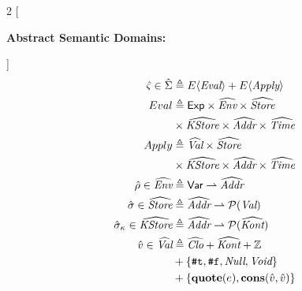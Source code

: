 \documentclass[12pt,draft]{article}
\newcommand{\truesyn}{\texttt{\#t}}
\newcommand{\falsesyn}{\texttt{\#f}}
\begin{document}
\begin{multicols*}{2}
  [
  \begin{center}
    \textbf{Abstract Semantic Domains:}
  \end{center}
  \vspace{-15mm}]
  \begin{align*}
    \vspace{-10mm}
    \hat{\varsigma} \in \hat{\Sigma}
    &\triangleq E\langle \textit{Eval} \rangle + E\langle \textit{Apply} \rangle\\
    Eval &\triangleq \textsf{Exp} \times \widehat{\textit{Env}} \times
           \widehat{\textit{Store}} \\
    &\times \widehat{\textit{KStore}} \times \widehat{\textit{Addr}}
      \times \widehat{\textit{Time}} \\
    Apply &\triangleq \widehat{\textit{Val}} \times \widehat{\textit{Store}} \\
    &\times \widehat{\textit{KStore}} \times \widehat{\textit{Addr}}
      \times \widehat{\textit{Time}} \\
    \hat{\rho} \in \widehat{\textit{Env}}
    &\triangleq \textsf{Var} \rightharpoonup \widehat{\textit{Addr}} \\
    \hat{\sigma} \in \widehat{\textit{Store}}
    &\triangleq \widehat{\textit{Addr}} \rightharpoonup \mathcal{P}(\textit{Val}) \\
    \hat{\sigma}_\kappa \in \widehat{\textit{KStore}}
    &\triangleq \widehat{\textit{Addr}}
      \rightharpoonup \mathcal{P}(\widehat{\textit{Kont}}) \\
    \hat{v} \in \widehat{\textit{Val}}
    &\triangleq \widehat{\textit{Clo}} + \widehat{\textit{Kont}} + \mathbb{Z} \\
    &+ \{\truesyn , \falsesyn , \textit{Null} , \textit{Void}\} \\
    &+ \{\textbf{quote}(e) , \textbf{cons}(\hat{v}, \hat{v})\} \\

\end{align*}
\end{multicols*}
\end{document}
